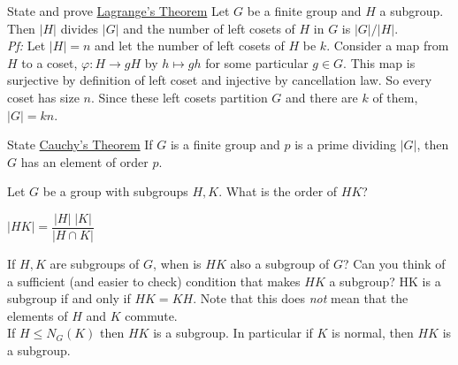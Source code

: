 \documentclass[avery5371,grid]{flashcards}
\let \phi \varphi
\begin{document}
\begin{flashcard}[Groups]{State and prove \underline{Lagrange's Theorem}}
 Let $G$ be a finite group and $H$ a subgroup. Then $|H|$ divides $|G|$ and the number of left cosets of $H$ in $G$ is $|G|/|H|$.\\
 
 \emph{Pf: } Let $|H|=n$ and let the number of left cosets of $H$ be $k$. Consider a map from $H$ to a coset, $\phi: H \to gH$ by $h \mapsto gh$ for some particular $g \in G$. This map is surjective by definition of left coset and injective by cancellation law. So every coset has size $n$. Since these left cosets partition $G$ and there are $k$ of them, $|G|=kn$.
\end{flashcard}

\begin{flashcard}[Groups]{State \underline{Cauchy's Theorem}}
 If $G$ is a finite group and $p$ is a prime dividing $|G|$, then $G$ has an element of order $p$.
\end{flashcard}

\begin{flashcard}[Groups]{Let $G$ be a group with subgroups $H,K$. What is the order of $HK$?}
\begin{center}
     $|HK| = \dfrac{|H| \; |K|}{|H \cap K|}$
\end{center}
\end{flashcard}

\begin{flashcard}[Groups]{If $H,K$ are subgroups of $G$, when is $HK$ also a subgroup of $G$? Can you think of a sufficient (and easier to check) condition that makes $HK$ a subgroup?}
 HK is a subgroup if and only if $HK = KH$. Note that this does \emph{not} mean that the elements of $H$ and $K$ commute.\\
 
 If $H \leq N_G(K)$ then $HK$ is a subgroup. In particular if $K$ is normal, then $HK$ is a subgroup.
\end{flashcard}
\end{document}
